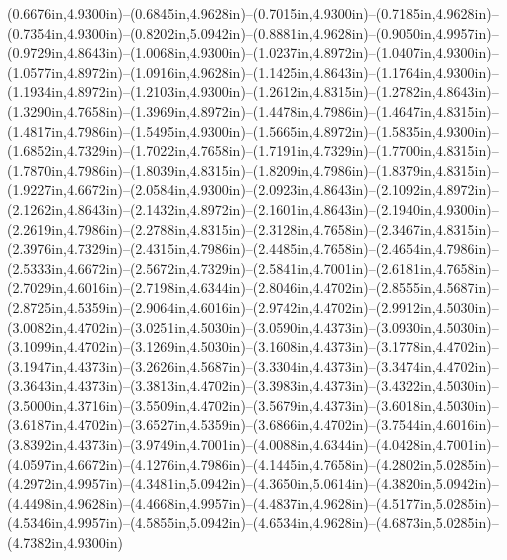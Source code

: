 (0.6676in,4.9300in)--(0.6845in,4.9628in)--(0.7015in,4.9300in)--(0.7185in,4.9628in)--(0.7354in,4.9300in)--(0.8202in,5.0942in)--(0.8881in,4.9628in)--(0.9050in,4.9957in)--(0.9729in,4.8643in)--(1.0068in,4.9300in)--(1.0237in,4.8972in)--(1.0407in,4.9300in)--(1.0577in,4.8972in)--(1.0916in,4.9628in)--(1.1425in,4.8643in)--(1.1764in,4.9300in)--(1.1934in,4.8972in)--(1.2103in,4.9300in)--(1.2612in,4.8315in)--(1.2782in,4.8643in)--(1.3290in,4.7658in)--(1.3969in,4.8972in)--(1.4478in,4.7986in)--(1.4647in,4.8315in)--(1.4817in,4.7986in)--(1.5495in,4.9300in)--(1.5665in,4.8972in)--(1.5835in,4.9300in)--(1.6852in,4.7329in)--(1.7022in,4.7658in)--(1.7191in,4.7329in)--(1.7700in,4.8315in)--(1.7870in,4.7986in)--(1.8039in,4.8315in)--(1.8209in,4.7986in)--(1.8379in,4.8315in)--(1.9227in,4.6672in)--(2.0584in,4.9300in)--(2.0923in,4.8643in)--(2.1092in,4.8972in)--(2.1262in,4.8643in)--(2.1432in,4.8972in)--(2.1601in,4.8643in)--(2.1940in,4.9300in)--(2.2619in,4.7986in)--(2.2788in,4.8315in)--(2.3128in,4.7658in)--(2.3467in,4.8315in)--(2.3976in,4.7329in)--(2.4315in,4.7986in)--(2.4485in,4.7658in)--(2.4654in,4.7986in)--(2.5333in,4.6672in)--(2.5672in,4.7329in)--(2.5841in,4.7001in)--(2.6181in,4.7658in)--(2.7029in,4.6016in)--(2.7198in,4.6344in)--(2.8046in,4.4702in)--(2.8555in,4.5687in)--(2.8725in,4.5359in)--(2.9064in,4.6016in)--(2.9742in,4.4702in)--(2.9912in,4.5030in)--(3.0082in,4.4702in)--(3.0251in,4.5030in)--(3.0590in,4.4373in)--(3.0930in,4.5030in)--(3.1099in,4.4702in)--(3.1269in,4.5030in)--(3.1608in,4.4373in)--(3.1778in,4.4702in)--(3.1947in,4.4373in)--(3.2626in,4.5687in)--(3.3304in,4.4373in)--(3.3474in,4.4702in)--(3.3643in,4.4373in)--(3.3813in,4.4702in)--(3.3983in,4.4373in)--(3.4322in,4.5030in)--(3.5000in,4.3716in)--(3.5509in,4.4702in)--(3.5679in,4.4373in)--(3.6018in,4.5030in)--(3.6187in,4.4702in)--(3.6527in,4.5359in)--(3.6866in,4.4702in)--(3.7544in,4.6016in)--(3.8392in,4.4373in)--(3.9749in,4.7001in)--(4.0088in,4.6344in)--(4.0428in,4.7001in)--(4.0597in,4.6672in)--(4.1276in,4.7986in)--(4.1445in,4.7658in)--(4.2802in,5.0285in)--(4.2972in,4.9957in)--(4.3481in,5.0942in)--(4.3650in,5.0614in)--(4.3820in,5.0942in)--(4.4498in,4.9628in)--(4.4668in,4.9957in)--(4.4837in,4.9628in)--(4.5177in,5.0285in)--(4.5346in,4.9957in)--(4.5855in,5.0942in)--(4.6534in,4.9628in)--(4.6873in,5.0285in)--(4.7382in,4.9300in) 